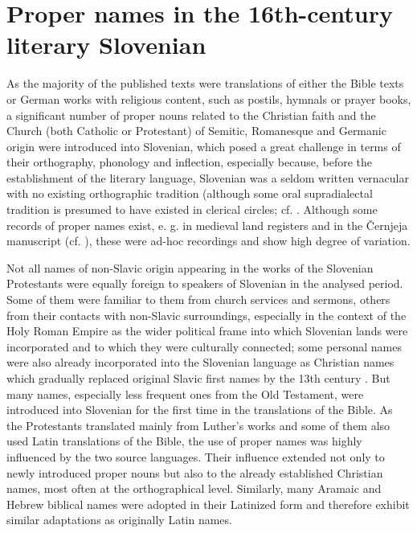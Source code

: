 \documentclass[output=paper,colorlinks,citecolor=brown,arabicfont,chinesefont]{langscibook}
\begin{document}
\section{Proper names in the 16th-century literary Slovenian}

As the majority of the published texts were translations of either the Bible texts or German works with religious content, such as postils, hymnals or prayer books, a significant number of proper nouns related to the Christian faith and the Church (both Catholic or Protestant) of Semitic, Romanesque and Germanic origin were introduced into Slovenian, which posed a great challenge in terms of their orthography, phonology and inflection, especially because, before the establishment of the literary language, Slovenian was a seldom written vernacular with no existing orthographic tradition (although some oral supradialectal tradition is presumed to have existed in clerical circles; cf. \citet{Pogorelec2011}. Although some records of proper names exist, e. g. in medieval land registers \citep[73--74]{Jakopin1986} and in the Černjeja manuscript (cf. \citealt[109--133]{Mikhailov1998}), these were ad-hoc recordings and show high degree of variation.

Not all names of non-Slavic origin appearing in the works of the Slovenian Protestants were equally foreign to speakers of Slovenian in the analysed period. Some of them were familiar to them from church services and sermons, others from their contacts with non-Slavic surroundings, especially in the context of the Holy Roman Empire as the wider political frame into which Slovenian lands were incorporated and to which they were culturally connected; some personal names were also already incorporated into the Slovenian language as Christian names which gradually replaced original Slavic first names by the 13th century \citep[70]{Jakopin1986}. But many names, especially less frequent ones from the Old Testament, were introduced into Slovenian for the first time in the translations of the Bible. As the Protestants translated mainly from Luther’s works and some of them also used Latin translations of the Bible, the use of proper names was highly influenced by the two source languages. Their influence extended not only to newly introduced proper nouns but also to the already established Christian names, most often at the orthographical level. Similarly, many Aramaic and Hebrew biblical names were adopted in their Latinized form and therefore exhibit similar adaptations as originally Latin names.
\end{document}
